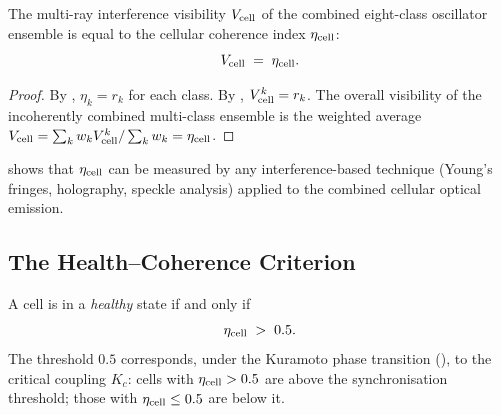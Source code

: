 \begin{theorem}
\label{thm:vis-coherence}
The multi-ray interference visibility $V_{\mathrm{cell}}$ of the combined eight-class
oscillator ensemble is equal to the cellular coherence index $\eta_{\mathrm{cell}}$:
\[
    V_{\mathrm{cell}} \;=\; \eta_{\mathrm{cell}}.
\]
\end{theorem}

\begin{proof}
By , $\eta_k = r_k$ for each class.  By
, $V_{\mathrm{cell}}^k = r_k$.  The overall visibility of the
incoherently combined multi-class ensemble is the weighted average
$V_{\mathrm{cell}} = \sum_k w_k V_{\mathrm{cell}}^k / \sum_k w_k = \eta_{\mathrm{cell}}$.
\end{proof}

 shows that $\eta_{\mathrm{cell}}$ can be measured by any
interference-based technique (Young's fringes, holography, speckle analysis)
applied to the combined cellular optical emission.

\subsection{The Health--Coherence Criterion}

\begin{theorem}
\label{thm:health-criterion}
A cell is in a \emph{healthy} state if and only if
\begin{equation}
    \eta_{\mathrm{cell}} \;>\; 0.5.
    \label{eq:health-criterion}
\end{equation}
The threshold $0.5$ corresponds, under the Kuramoto phase transition
(), to the critical coupling $K_c$: cells with
$\eta_{\mathrm{cell}} > 0.5$ are above the synchronisation threshold; those with
$\eta_{\mathrm{cell}} \le 0.5$ are below it.
\end{theorem}

